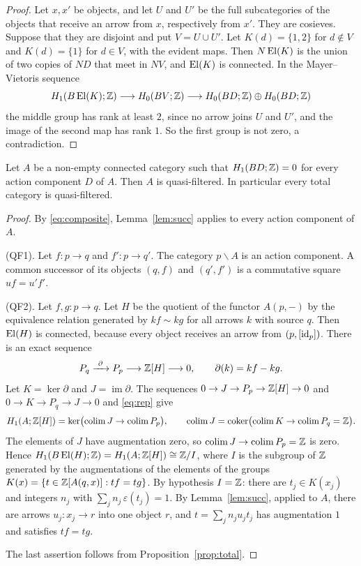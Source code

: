 \begin{proof}
Let $x,x'$ be objects, and let $U$ and $U'$ be the full subcategories of the
objects that receive an arrow from $x$, respectively from $x'$. They are
cosieves. Suppose that they are disjoint and put $V=U\cup U'$. Let
$K(d)=\{1,2\}$ for $d\notin V$ and $K(d)=\{1\}$ for $d\in V$, with the
evident maps. Then $N\operatorname{El}(K)$ is the union of two copies of $ND$ that meet in
$NV$, and $\operatorname{El}(K)$ is connected. In the Mayer--Vietoris sequence
\[
 H_1(B\operatorname{El}(K);\mathbb{Z})\longrightarrow H_0(BV;\mathbb{Z})\longrightarrow
 H_0(BD;\mathbb{Z})\oplus H_0(BD;\mathbb{Z})
\]
the middle group has rank at least $2$, since no arrow joins $U$ and $U'$,
and the image of the second map has rank $1$. So the first group is not
zero, a contradiction.
\end{proof}

\begin{proposition}\label{prop:qf}
Let $A$ be a non-empty connected category such that $H_1(BD;\mathbb{Z})=0$ for every
action component $D$ of $A$. Then $A$ is quasi-filtered. In particular every
total category is quasi-filtered.
\end{proposition}

\begin{proof}
By \eqref{eq:composite}, Lemma~\ref{lem:succ} applies to every action
component of $A$.

(QF1). Let $f\colon p\to q$ and $f'\colon p\to q'$. The category
$p\backslash A$ is an action component. A common successor of its objects
$(q,f)$ and $(q',f')$ is a commutative square $uf=u'f'$.

(QF2). Let $f,g\colon p\to q$. Let $H$ be the quotient of the functor
$A(p,-)$ by the equivalence relation generated by $kf\sim kg$ for all arrows
$k$ with source $q$. Then $\operatorname{El}(H)$ is connected, because every object
receives an arrow from $(p,[\mathrm{id}_p])$. There is an exact sequence
\[
 P_q\xrightarrow{\ \partial\ }P_p\longrightarrow\Z[H]\longrightarrow 0,
 \qquad\partial(k)=kf-kg .
\]
Let $K=\ker\partial$ and $J=\operatorname{im}\partial$. The sequences
$0\to J\to P_p\to\mathbb{Z}[H]\to0$ and $0\to K\to P_q\to J\to 0$ and \eqref{eq:rep}
give
\[
 H_1(A;\mathbb{Z}[H])=\ker\bigl(\operatorname{colim} J\to\operatorname{colim} P_p\bigr),\qquad
 \operatorname{colim} J=\operatorname{coker}\bigl(\operatorname{colim} K\to\operatorname{colim} P_q=\mathbb{Z}\bigr).
\]
The elements of $J$ have augmentation zero, so $\operatorname{colim} J\to\operatorname{colim} P_p=\mathbb{Z}$ is
zero. Hence $H_1(B\operatorname{El}(H);\mathbb{Z})=H_1(A;\mathbb{Z}[H])\cong\mathbb{Z}/I$, where $I$ is the subgroup
of $\mathbb{Z}$ generated by the augmentations of the elements of the groups
$K(x)=\{t\in\mathbb{Z}[A(q,x)]:tf=tg\}$. By hypothesis $I=\mathbb{Z}$: there are
$t_j\in K(x_j)$ and integers $n_j$ with $\sum_jn_j\,\varepsilon(t_j)=1$. By
Lemma~\ref{lem:succ}, applied to $A$, there are arrows $u_j\colon x_j\to r$
into one object $r$, and $t=\sum_jn_ju_jt_j$ has augmentation $1$ and
satisfies $tf=tg$.

The last assertion follows from Proposition~\ref{prop:total}.
\end{proof}

